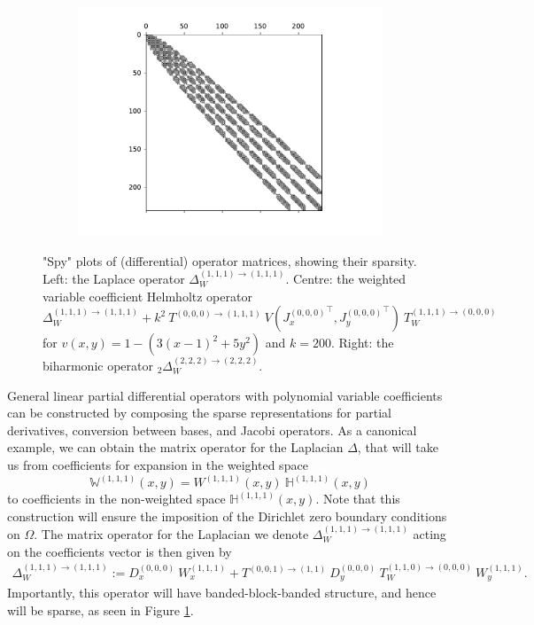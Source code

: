 \documentclass[11pt, oneside]{article}   	%
\newcommand{\hdop}{H}
\newcommand{\Wiii}{W^{(1,1,1)}}
\newcommand{\bighdopiii}{{\mathbb{\hdop}^{(1,1,1)}}}
\newcommand{\laplacewiii}{\Delta_W^{(1,1,1)\to(1,1,1)}}
\newcommand{\biharmonictwo}{_2\Delta_W^{(2,2,2)\to(2,2,2)}}
\newcommand{\bigWiii}{{\mathbb{W}^{(1,1,1)}}}
\begin{document}
\begin{figure}[t]
\begin{subfigure}{0.32\textwidth}
	\includegraphics[scale=0.35]{sparsityofbiharmonic}
        \centering
	\end{subfigure}
    	\caption{"Spy" plots of (differential) operator matrices, showing their sparsity. Left: the Laplace operator $\laplacewiii$. Centre: the weighted variable coefficient Helmholtz operator $\laplacewiii + k^2 \: T^{(0,0,0)\to(1,1,1)} \: V({J_x^{(0,0,0)}}^\top, {J_y^{(0,0,0)}}^\top) \: T_W^{(1,1,1)\to(0,0,0)}$ for $v(x,y) = 1 - (3(x-1)^2 + 5y^2)$ and $k = 200$. Right: the biharmonic operator $\biharmonictwo$.}
        \label{fig:sparsity}
        \centering
\end{figure}

General linear partial differential operators with polynomial variable coefficients can be constructed by composing the sparse representations for partial derivatives, conversion between bases, and Jacobi operators. As a canonical example, we can obtain the matrix operator for the Laplacian \(\Delta\), that will take us from coefficients for expansion in the weighted space
$$
\bigWiii(x,y) = \Wiii(x,y) \: \bighdopiii(x,y)
$$
to coefficients in the non-weighted space $\bighdopiii(x,y)$. Note that this construction will ensure the imposition of the Dirichlet zero boundary conditions on $\Omega$. The matrix operator for the Laplacian we denote $\laplacewiii$ acting on the coefficients vector is then given by
\begin{align*}
    \laplacewiii := D_x^{(0,0,0)} \: W_x^{(1,1,1)} + T^{(0,0,1)\to(1,1)} \: D_y^{(0,0,0)} \: T_W^{(1,1,0)\to(0,0,0)} \: W_y^{(1,1,1)}.
\end{align*}
Importantly, this operator will have banded-block-banded structure, and hence will be sparse, as seen in Figure \ref{fig:sparsity}.
\end{document}
